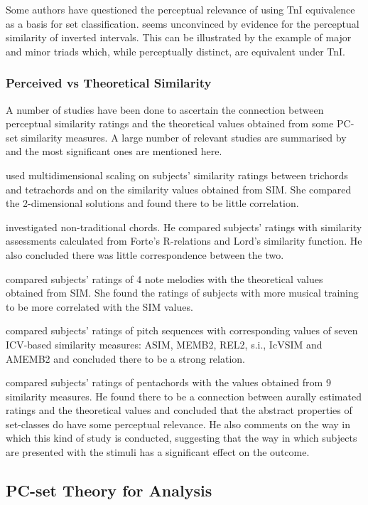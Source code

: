 \documentclass{article}
\begin{document}
Some authors have questioned the perceptual relevance of using TnI
equivalence as a basis for set classification. \citet{Deutsch1982}
seems unconvinced by evidence for the perceptual similarity of
inverted intervals. This can be illustrated by the example of major
and minor triads which, while perceptually distinct, are equivalent
under TnI.
\subsubsection{Perceived vs Theoretical Similarity}
\label{sec-3-5-3}

A number of studies have been done to ascertain the connection between
perceptual similarity ratings and the theoretical values obtained from
some PC-set similarity measures. A large number of relevant studies
are summarised by \citet{Kuusi2001} and the most significant ones are
mentioned here.

\citet{Bruner1984} used multidimensional scaling on subjects'
similarity ratings between trichords and tetrachords and on the
similarity values obtained from SIM. She compared the 2-dimensional
solutions and found there to be little correlation.

\citet{Gibson1986} investigated non-traditional chords. He compared
subjects' ratings with similarity assessments calculated from Forte's
R-relations and Lord's similarity function. He also concluded there
was little correspondence between the two.

\citet{Stammers1994} compared subjects' ratings of 4 note melodies with
the theoretical values obtained from SIM. She found the ratings of
subjects with more musical training to be more correlated with the SIM
values.

\citet{Lane1997} compared subjects' ratings of pitch sequences with
corresponding values of seven ICV-based similarity measures: ASIM,
MEMB2, REL2, s.i., IcVSIM and AMEMB2 and concluded there to be a
strong relation.

\citet{Kuusi2001} compared subjects' ratings of pentachords with the
values obtained from 9 similarity measures. He found there to be a
connection between aurally estimated ratings and the theoretical
values and concluded that the abstract properties of set-classes do
have some perceptual relevance. He also comments on the way in which
this kind of study is conducted, suggesting that the way in which
subjects are presented with the stimuli has a significant effect on
the outcome.
\subsection{PC-set Theory for Analysis}
\label{sec-3-6}
\end{document}
